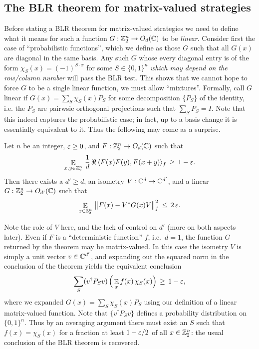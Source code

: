 \subsection{The BLR theorem for matrix-valued strategies}
\label{subsection-blr-theorem-matrix-val-strat}

Before stating a BLR theorem for matrix-valued strategies we need to define what it means for such a function $G: \mathbb{Z}_2^n \to O_d(\mathbb{C})$ to be \emph{linear}. Consider first the case of ``probabilistic functions'', which we define as those $G$ such that all $G(x)$ are diagonal in the same basis. Any such $G$ whose every diagonal entry is of the form $\chi_{S}(x) = (-1)^{S \cdot x}$ for some $S\in\{0,1\}^n$ \emph{which may depend on the row/column number} will pass the BLR test. This shows that we cannot hope to force $G$ to be a single linear function, we must allow ``mixtures''. Formally, call $G$ linear if $G(x) = \sum_S \chi_S(x) P_S$ for some decomposition $\{P_S\}$ of the identity, i.e. the $P_S$ are pairwsie orthogonal projections such that $\sum_S P_S=I$. Note that this indeed captures the probabilistic case; in fact, up to a basis change it is essentially equivalent to it. Thus the following may come as a surprise.  

\begin{theorem}\label{theorem-blr}
Let $n$ be an integer, $\varepsilon\geq 0$, and $F:\mathbb{Z}_2^n \to O_d(\mathbb{C})$ such that
\begin{equation}\label{eq:approx-linear}
\mathop{\mathbb{E}}\displaylimits_{x,y\in \mathbb{Z}_2^n} \, \frac{1}{d}\,\Re\,\langle F(x)F(y),F(x+y)\rangle_f \,\geq\, 1-\varepsilon.
\end{equation}
 Then there exists a $d'\geq d$, an isometry $V:\mathbb{C}^d\to\mathbb{C}^{d'}$, and a linear $G:\mathbb{Z}_2^n \to O_{d'}(\mathbb{C})$ such that 
$$\mathop{\mathbb{E}}\displaylimits_{x\in\mathbb{Z}_2^n} \,\big\| F(x) - V^* G(x)V\big\|_f^2 \,\leq\, 2\,\varepsilon.$$
\end{theorem}

Note the role of $V$ here, and the lack of control on $d'$ (more on both aspects later). Even if $F$ is a ``deterministic function'' $f$, i.e.\ $d=1$, the function $G$ returned by the theorem may be matrix-valued. In this case the isometry $V$ is simply a unit vector $v\in \mathbb{C}^{d'}$, and expanding out the squared norm in the conclusion of the theorem yields the equivalent conclusion 
$$\sum_S (v^\dagger P_S v)\,\Big(\mathop{\mathbb{E}}\displaylimits_{x}  f(x)\, \chi_S(x) \Big)  \,\geq\, 1-\varepsilon,$$ 
where we expanded $G(x) = \sum_S \chi_S(x) P_S$ using our definition of a linear matrix-valued function. Note that $\{ v^\dagger P_S v\}$ defines a probability distribution on $\{0,1\}^n$. Thus by an averaging argument there must exist an $S$ such that $f(x)=\chi_S(x)$ for a fraction at least $1-\varepsilon/2$ of all $x\in\mathbb{Z}_2^n$: the usual conclusion of the BLR theorem is recovered. 

